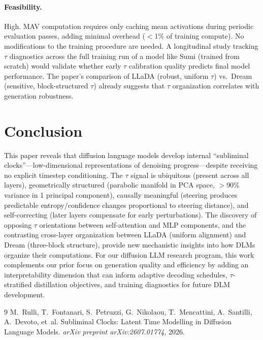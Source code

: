 \documentclass[11pt,a4paper]{article}
\begin{document}
\paragraph{Feasibility.}
High. MAV computation requires only caching mean activations during periodic evaluation passes, adding minimal overhead ($<$1\% of training compute). No modifications to the training procedure are needed. A longitudinal study tracking $\tau$ diagnostics across the full training run of a model like Sumi (trained from scratch) would validate whether early $\tau$ calibration quality predicts final model performance. The paper's comparison of LLaDA (robust, uniform $\tau$) vs.\ Dream (sensitive, block-structured $\tau$) already suggests that $\tau$ organization correlates with generation robustness.

\section{Conclusion}

This paper reveals that diffusion language models develop internal ``subliminal clocks''---low-dimensional representations of denoising progress---despite receiving no explicit timestep conditioning. The $\tau$ signal is ubiquitous (present across all layers), geometrically structured (parabolic manifold in PCA space, $>$90\% variance in 1 principal component), causally meaningful (steering produces predictable entropy/confidence changes proportional to steering distance), and self-correcting (later layers compensate for early perturbations). The discovery of opposing $\tau$ orientations between self-attention and MLP components, and the contrasting cross-layer organization between LLaDA (uniform alignment) and Dream (three-block structure), provide new mechanistic insights into how DLMs organize their computations. For our diffusion LLM research program, this work complements our prior focus on generation quality and efficiency by adding an interpretability dimension that can inform adaptive decoding schedules, $\tau$-stratified distillation objectives, and training diagnostics for future DLM development.


\begin{thebibliography}{9}
M.~Rulli, T.~Fontanari, S.~Petruzzi, G.~Nikolaou, T.~Mencattini, A.~Santilli, A.~Devoto, et~al.
\newblock Subliminal Clocks: Latent Time Modelling in Diffusion Language Models.
\newblock \emph{arXiv preprint arXiv:2607.01774}, 2026.
\end{thebibliography}
\end{document}
